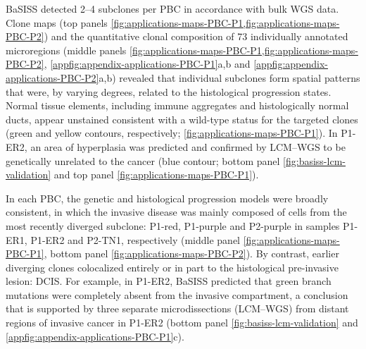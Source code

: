 \ac{BaSISS} detected 2–4 subclones per \ac{PBC} in accordance with bulk \ac{WGS} data. Clone maps (top panels \cref{fig:applications-maps-PBC-P1,fig:applications-maps-PBC-P2}) and the quantitative clonal composition of 73 individually annotated microregions (middle panels \cref{fig:applications-maps-PBC-P1,fig:applications-maps-PBC-P2}, \cref{appfig:appendix-applications-PBC-P1}a,b and \cref{appfig:appendix-applications-PBC-P2}a,b) revealed that individual subclones form spatial patterns that were, by varying degrees, related to the histological progression states. Normal tissue elements, including immune aggregates and histologically normal ducts, appear unstained consistent with a wild-type status for the targeted clones (green and yellow contours, respectively; \cref{fig:applications-maps-PBC-P1}). In P1-ER2, an area of hyperplasia was predicted and confirmed by \ac{LCM}–\ac{WGS} to be genetically unrelated to the cancer (blue contour; bottom panel \cref{fig:basiss-lcm-validation} and top panel \cref{fig:applications-maps-PBC-P1}).

In each \ac{PBC}, the genetic and histological progression models were broadly consistent, in which the invasive disease was mainly composed of cells from the most recently diverged subclone: P1-red, P1-purple and P2-purple in samples P1-ER1, P1-ER2 and P2-TN1, respectively (middle panel \cref{fig:applications-maps-PBC-P1}, bottom panel \cref{fig:applications-maps-PBC-P2}). By contrast, earlier diverging clones colocalized entirely or in part to the histological pre-invasive lesion: \ac{DCIS}. For example, in P1-ER2, \ac{BaSISS} predicted that green branch mutations were completely absent from the invasive compartment, a conclusion that is supported by three separate microdissections (\ac{LCM}–\ac{WGS}) from distant regions of invasive cancer in P1-ER2 (bottom panel \cref{fig:basiss-lcm-validation} and \cref{appfig:appendix-applications-PBC-P1}c).

